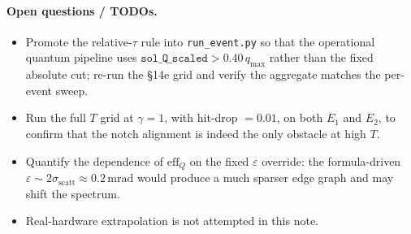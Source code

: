 \documentclass[11pt,a4paper]{article}
\newcommand{\eff}{\mathrm{eff}}
\begin{document}
\paragraph{Open questions / TODOs.}
\begin{itemize}
\item[--] Promote the relative-$\tau$ rule into \texttt{run\_event.py} so that the
operational quantum pipeline uses $\texttt{sol\_Q\_scaled} > 0.40\,q_{\max}$ rather than
the fixed absolute cut; re-run the §14e grid and verify the aggregate matches the
per-event sweep.
\item[--] Run the full $T$ grid at $\gamma = 1$, with hit-drop $= 0.01$, on both $E_1$
and $E_2$, to confirm that the notch alignment is indeed the only obstacle at high $T$.
\item[--] Quantify the dependence of $\eff_Q$ on the fixed $\varepsilon$ override:
the formula-driven $\varepsilon \sim 2 \sigma_{\mathrm{scatt}} \approx 0.2\,\mathrm{mrad}$
would produce a much sparser edge graph and may shift the spectrum.
\item[--] Real-hardware extrapolation is not attempted in this note.
\end{itemize}



\end{document}
